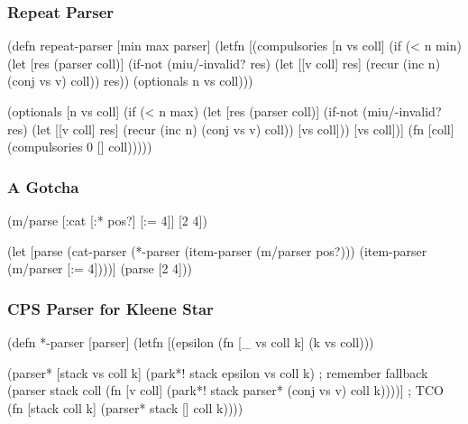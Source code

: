 \documentclass{beamer}
\begin{document}

\begin{frame}[fragile]
\frametitle{Repeat Parser}

{\scriptsize
\begin{semiverbatim}
(defn repeat-parser [min max parser]
  (letfn [(compulsories [n vs coll]
            (if (< n min)
              (let [res (parser coll)]
                (if-not (miu/-invalid? res)
                  (let [[v coll] res]
                    (recur (inc n) (conj vs v) coll))
                  res))
              (optionals n vs coll)))

          (optionals [n vs coll]
            (if (< n max)
              (let [res (parser coll)]
                (if-not (miu/-invalid? res)
                  (let [[v coll] res]
                    (recur (inc n) (conj vs v) coll))
                  [vs coll]))
              [vs coll])]
    (fn [coll] (compulsories 0 [] coll)))))
\end{semiverbatim}
}

\end{frame}


\begin{frame}[fragile]
\frametitle{A Gotcha}

{\scriptsize
\begin{semiverbatim}
(m/parse [:cat [:* pos?] [:= 4]] [2 4])
\end{semiverbatim}

\begin{semiverbatim}
(let [parse (cat-parser (*-parser (item-parser (m/parser pos?)))
                        (item-parser (m/parser [:= 4])))]
  (parse [2 4]))
\end{semiverbatim}
}

\end{frame}


\begin{frame}[fragile]
\frametitle{CPS Parser for Kleene Star}

{\scriptsize
\begin{semiverbatim}
(defn *-parser [parser]
  (letfn [(epsilon (fn [_ vs coll k] (k vs coll)))

          (parser* [stack vs coll k]
            (park*! stack epsilon vs coll k) ; remember fallback
            (parser stack coll
                    (fn [v coll]
                      (park*! stack parser* (conj vs v) coll k))))] ; TCO
    (fn [stack coll k] (parser* stack [] coll k))))
\end{semiverbatim}
}

\end{frame}
\end{document}

